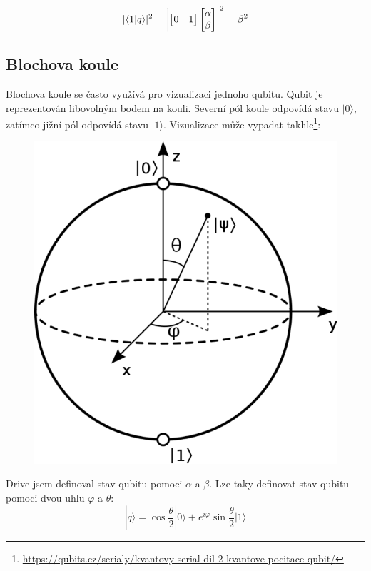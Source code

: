 \documentclass[11pt]{article}
\DeclarePairedDelimiter{\abs}{\lvert}{\rvert}
\begin{document}
$$|\langle 1 | q \rangle|^2 = \abs*{\begin{bmatrix}
            0 & 1
        \end{bmatrix}\begin{bmatrix}
            \alpha \\
            \beta
        \end{bmatrix}}^2 = \beta ^ 2$$

\subsection{Blochova koule}
Blochova koule se často využívá pro vizualizaci jednoho qubitu.
Qubit je reprezentován libovolným bodem na kouli.
Severní pól koule odpovídá stavu $|0\rangle$, zatímco jižní pól odpovídá stavu $|1\rangle$.
\sloppy
Vizualizace může vypadat takhle\footnote{\url{https://qubits.cz/serialy/kvantovy-serial-dil-2-kvantove-pocitace-qubit/}}:
\begin{figure}[H]
    \includegraphics[scale=0.25]{Bloch_sphere}
    \centering
\end{figure}

\par Drive jsem definoval stav qubitu pomoci $\alpha$ a $\beta$.
Lze taky definovat stav qubitu pomoci dvou uhlu $\varphi$ a $\theta$:
$$|q\rangle = \cos{\frac{\theta}{2}}|0\rangle + e^{i\varphi}\sin{\frac{\theta}{2}}|1\rangle $$
\end{document}
